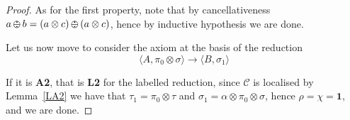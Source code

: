 \documentclass{llncs}
\def\1{{\mathbf 1}}
\def\C{{\mathcal C}}
\newcommand{\comment}[1]{}
\def\1{{\mathbf 1}}
\def\C{{\mathcal C}}
\def\odiv{\, {\ominus\hspace{-7.7pt} \div} \,}
\begin{document}
\begin{proof}
%
As for the first property, note that by cancellativeness
$a \odiv b = (a \otimes c) \odiv (a \otimes c)$, 
hence by inductive hypothesis we are done.

\comment{
Now, recall that by monotonicity 
$\sigma_1 = (\sigma_1 \odiv ( \pi_0 \otimes \sigma)) \otimes  \pi_0 \otimes \sigma$ (Lemma~\ref{mono}) and
$\tau_1 = (\tau_1 \odiv (\beta \otimes \pi_0 \otimes \tau)) \otimes \beta \otimes \pi_0 \otimes \tau$ 
(Lemma~\ref{l-mono}). 
}

Let us now move to consider the axiom at the basis of the reduction
$$\langle A, \pi_0 \otimes \sigma \rangle \to  \langle B, \sigma_1 \rangle$$

If it is \mbox{\bf A2}, that is \mbox{\bf L2} for the labelled reduction,
since $\C$ is localised by Lemma~\ref{LA2} we have that 
$\tau_1 = \pi_0 \otimes \tau$ and $\sigma_1 = \alpha \otimes \pi_0 \otimes \sigma$,
hence $\rho = \chi = \1$, and we are done.


\end{proof}
\end{document}
